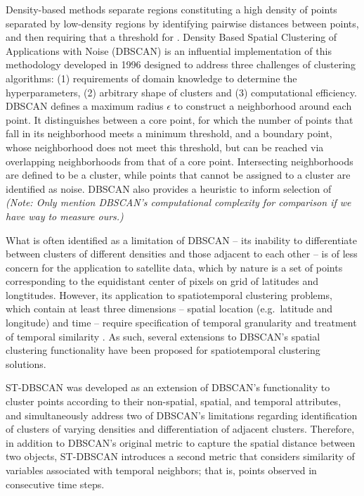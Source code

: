 Density-based methods separate regions constituting a high density of
points separated by low-density regions by identifying pairwise
distances between points, and then requiring that a threshold for
\citep{datamining2012}. Density Based Spatial Clustering of Applications
with Noise (DBSCAN) \citep{ester1996density} is an influential
implementation of this methodology developed in 1996 designed to address
three challenges of clustering algorithms: (1) requirements of domain
knowledge to determine the hyperparameters, (2) arbitrary shape of
clusters and (3) computational efficiency. DBSCAN defines a maximum
radius \(\epsilon\) to construct a neighborhood around each point. It
distinguishes between a core point, for which the number of points that
fall in its neighborhood meets a minimum threshold, and a boundary
point, whose neighborhood does not meet this threshold, but can be
reached via overlapping neighborhoods from that of a core point.
Intersecting neighborhoods are defined to be a cluster, while points
that cannot be assigned to a cluster are identified as noise. DBSCAN
also provides a heuristic to inform selection of \emph{(Note: Only
mention DBSCAN's computational complexity for comparison if we have way
to measure ours.)}

What is often identified as a limitation of DBSCAN -- its inability to
differentiate between clusters of different densities and those adjacent
to each other \citep{stdbscan} -- is of less concern for the application
to satellite data, which by nature is a set of points corresponding to
the equidistant center of pixels on grid of latitudes and longtitudes.
However, its application to spatiotemporal clustering problems, which
contain at least three dimensions -- spatial location (e.g.~latitude and
longitude) and time -- require specification of temporal granularity and
treatment of temporal similarity \citep{kisilevich2009spatio}. As such,
several extensions to DBSCAN's spatial clustering functionality have
been proposed for spatiotemporal clustering solutions.

ST-DBSCAN \citep{stdbscan} was developed as an extension of DBSCAN's
functionality to cluster points according to their non-spatial, spatial,
and temporal attributes, and simultaneously address two of DBSCAN's
limitations regarding identification of clusters of varying densities
and differentiation of adjacent clusters. Therefore, in addition to
DBSCAN's original metric to capture the spatial distance between two
objects, ST-DBSCAN introduces a second metric that considers similarity
of variables associated with temporal neighbors; that is, points
observed in consecutive time steps.

